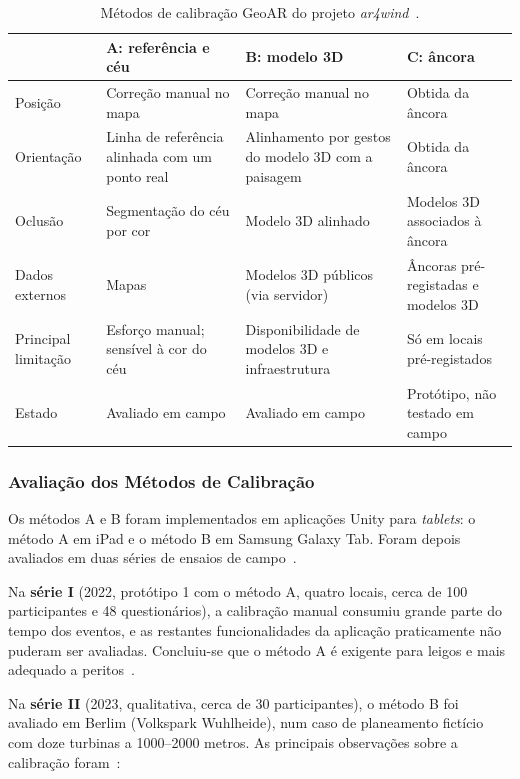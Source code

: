 \begin{table}[htbp]
\centering
\caption{Métodos de calibração GeoAR do projeto \textit{ar4wind}~\cite{ar4wind2023}.}
\label{tab:ar4wind_metodos}
\small
\begin{tabular}{p{2.5cm}p{3.5cm}p{3.5cm}p{3.5cm}}
\hline
 & \textbf{A: referência e céu} & \textbf{B: modelo 3D} & \textbf{C: âncora} \\
\hline
Posição & Correção manual no mapa & Correção manual no mapa & Obtida da âncora \\
Orientação & Linha de referência alinhada com um ponto real & Alinhamento por gestos do modelo 3D com a paisagem & Obtida da âncora \\
Oclusão & Segmentação do céu por cor & Modelo 3D alinhado & Modelos 3D associados à âncora \\
Dados externos & Mapas & Modelos 3D públicos (via servidor) & Âncoras pré-registadas e modelos 3D \\
Principal limitação & Esforço manual; sensível à cor do céu & Disponibilidade de modelos 3D e infraestrutura & Só em locais pré-registados \\
Estado & Avaliado em campo & Avaliado em campo & Protótipo, não testado em campo \\
\hline
\end{tabular}
\end{table}

\subsubsection{Avaliação dos Métodos de Calibração}

Os métodos A e B foram implementados em aplicações Unity para \textit{tablets}: o método A em iPad e o método B em Samsung Galaxy Tab. Foram depois avaliados em duas séries de ensaios de campo~\cite[Sec.~2.2.3 e 2.2.4]{ar4wind2023}.

Na \textbf{série I} (2022, protótipo 1 com o método A, quatro locais, cerca de 100 participantes e 48 questionários), a calibração manual consumiu grande parte do tempo dos eventos, e as restantes funcionalidades da aplicação praticamente não puderam ser avaliadas. Concluiu-se que o método A é exigente para leigos e mais adequado a peritos~\cite[Sec.~2.2.4.1]{ar4wind2023}.

Na \textbf{série II} (2023, qualitativa, cerca de 30 participantes), o método B foi avaliado em Berlim (Volkspark Wuhlheide), num caso de planeamento fictício com doze turbinas a 1000--2000 metros. As principais observações sobre a calibração foram~\cite[Sec.~2.2.4.2]{ar4wind2023}:

